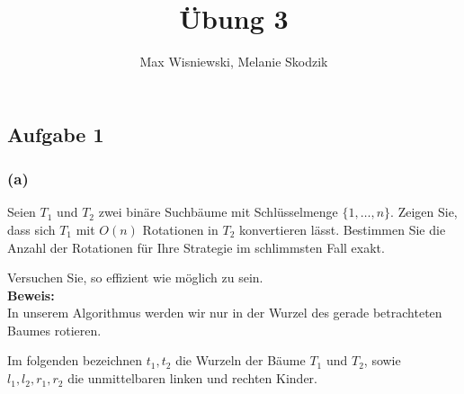 \documentclass[11pt,a4paper,ngerman]{article}
\date{}
\title{Übung 3}
\author{Max Wisniewski, Melanie Skodzik}
\begin{document}

\renewcommand{\figurename}{Grafik}

\maketitle
\thispagestyle{fancy}


\subsection*{Aufgabe 1}

\subsubsection*{(a)}
Seien $T_1$ und $T_2$ zwei binäre Suchbäume mit Schlüsselmenge $\{1, \ldots, n\}$. Zeigen Sie, dass sich $T_1$ mit $O(n)$ Rotationen in $T_2$ konvertieren lässt. Bestimmen Sie die Anzahl der Rotationen für Ihre Strategie im schlimmsten Fall exakt.

Versuchen Sie, so effizient wie möglich zu sein.\\

\noindent\textbf{Beweis:}\\

In unserem Algorithmus werden wir nur in der Wurzel des gerade betrachteten Baumes rotieren. 

Im folgenden bezeichnen $t_1,t_2$ die Wurzeln der Bäume $T_1$ und $T_2$, sowie $l_1,l_2, r_1, r_2$ die unmittelbaren linken und rechten Kinder.\\
\end{document}
